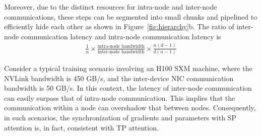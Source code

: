 Moreover, due to the distinct resources for intra-node and inter-node communications, these steps can be segmented into small chunks and pipelined to efficiently hide each other as shown in Figure~\ref{fig:hierarchy}b. The ratio of inter-node communication latency and intra-node communication latency is
\begin{align} \label{eq:ratio}
    \frac{1}{n} \times \frac{\text{intra-node bandwidth}}{\text{inter-node bandwidth}} \times \frac{n(d-1)}{d(n-1)}
\end{align}

Consider a typical training scenario involving an H100 SXM machine, where the NVLink bandwidth is 450 GB/s, and the inter-device NIC communication bandwidth is 50 GB/s. In this context, the latency of inter-node communication can easily surpass that of intra-node communication. This implies that the communication within a node can overshadow that between nodes. Consequently, in such scenarios, the synchronization of gradients and parameters with SP attention is, in fact, consistent with TP attention.

